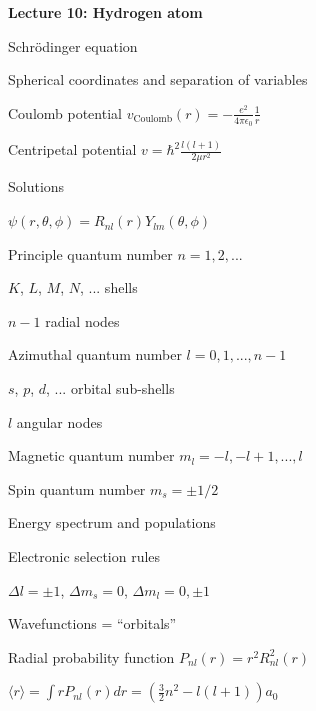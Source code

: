\documentclass[11pt]{article}
\begin{document}
\begin{outline}
\item{{\bf Lecture 10: Hydrogen atom}}
  \begin{outline}
  \item Schr\"odinger equation
    \begin{outline}
    \item Spherical coordinates and separation of variables
    \item Coulomb potential $v_\mathrm{Coulomb}(r)=-\frac{e^2}{4\pi\epsilon_0}\frac{1}{r}$
    \item Centripetal potential  $v=\hbar^2\frac{l(l+1)}{2\mu r^2}$
    \end{outline}
    \item Solutions
    \begin{outline}
  \item{$\psi(r,\theta,\phi)=R_{nl}(r)Y_{lm}(\theta,\phi)$}
  \item Principle quantum number $n=1,2,...$
    \begin{outline}
    \item $K$, $L$, $M$, $N$, ... shells
    \item $n-1$ radial nodes
    \end{outline}
  \item Azimuthal quantum number $l=0,1,...,n-1$
    \begin{outline}
    \item $s$, $p$, $d$, ... orbital sub-shells
    \item $l$ angular nodes
    \end{outline}
  \item Magnetic quantum number $m_l=-l,-l+1,...,l$
  \item Spin quantum number $m_s=\pm 1/2$
    \end{outline}
  \item Energy spectrum and populations
  \item Electronic selection rules
    \begin{outline}
    \item $\Delta l=\pm 1$, $\Delta m_s =0$, $\Delta m_l = 0,\pm 1$
    \end{outline}
  \item Wavefunctions = ``orbitals''
  \item Radial probability function $P_{nl}(r)=r^2 R_{nl}^2(r)$
    \begin{outline}
    \item $\langle r\rangle = \int r P_{nl}(r) dr = (\frac{3}{2}n^2-l(l+1))a_0$
    \end{outline}

\end{outline}
\end{outline}
\end{document}
